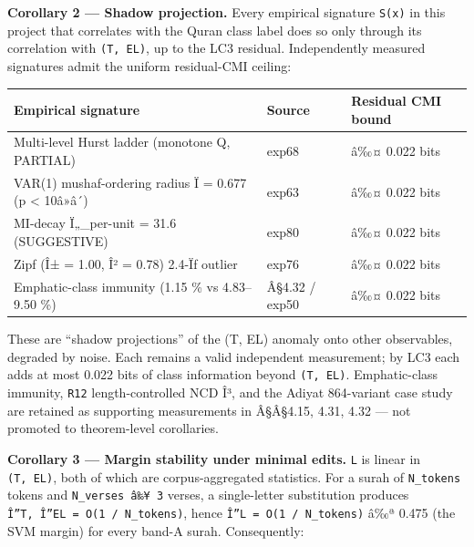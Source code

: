 \documentclass[
]{article}
\newcounter{none} %
\begin{document}
\textbf{Corollary 2 --- Shadow projection.} Every empirical signature
\texttt{S(x)} in this project that correlates with the Quran class label
does so only through its correlation with \texttt{(T,\ EL)}, up to the
LC3 residual. Independently measured signatures admit the uniform
residual-CMI ceiling:

{\def\LTcaptype{none} %
\begin{longtable}[]{@{}
  >{\raggedright\arraybackslash}p{}
  >{\raggedright\arraybackslash}p{}
  >{\raggedleft\arraybackslash}p{}@{}}
\toprule\noalign{}
\begin{minipage}[b]{\linewidth}\raggedright
Empirical signature
\end{minipage} & \begin{minipage}[b]{\linewidth}\raggedright
Source
\end{minipage} & \begin{minipage}[b]{\linewidth}\raggedleft
Residual CMI bound
\end{minipage} \\
\midrule\noalign{}
\endhead
\bottomrule\noalign{}
\endlastfoot
Multi-level Hurst ladder (monotone Q, PARTIAL) & exp68 & â‰¤ 0.022
bits \\
VAR(1) mushaf-ordering radius Ï = 0.677 (p \textless{} 10â»â´) & exp63 &
â‰¤ 0.022 bits \\
MI-decay Ï„\_per-unit = 31.6 (SUGGESTIVE) & exp80 & â‰¤ 0.022 bits \\
Zipf (Î± = 1.00, Î² = 0.78) 2.4-Ïƒ outlier & exp76 & â‰¤ 0.022 bits \\
Emphatic-class immunity (1.15 \% vs 4.83--9.50 \%) & Â§4.32 / exp50 &
â‰¤ 0.022 bits \\
\end{longtable}
}

These are ``shadow projections'' of the (T, EL) anomaly onto other
observables, degraded by noise. Each remains a valid independent
measurement; by LC3 each adds at most 0.022 bits of class information
beyond \texttt{(T,\ EL)}. Emphatic-class immunity, \texttt{R12}
length-controlled NCD Î³, and the Adiyat 864-variant case study are
retained as supporting measurements in Â§Â§4.15, 4.31, 4.32 --- not
promoted to theorem-level corollaries.

\textbf{Corollary 3 --- Margin stability under minimal edits.}
\texttt{L} is linear in \texttt{(T,\ EL)}, both of which are
corpus-aggregated statistics. For a surah of \texttt{N\_tokens} tokens
and \texttt{N\_verses\ â‰¥\ 3} verses, a single-letter substitution
produces
\texttt{\textbar{}Î”T\textbar{},\ \textbar{}Î”EL\textbar{}\ =\ O(1\ /\ N\_tokens)},
hence \texttt{\textbar{}Î”L\textbar{}\ =\ O(1\ /\ N\_tokens)} â‰ª 0.475
(the SVM margin) for every band-A surah. Consequently:
\end{document}
